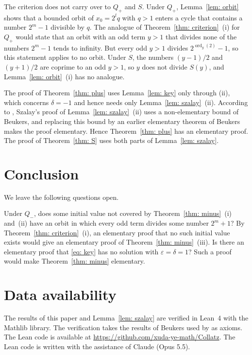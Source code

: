\documentclass{article}
\newcommand{\ord}{\operatorname{ord}}
\begin{document}
The criterion does not carry over to $Q_+$ and $S$. Under $Q_+$, Lemma~\ref{lem: orbit} shows that a bounded orbit of $x_0 = 2^l q$ with $q > 1$ enters a cycle that contains a number $2^m - 1$ divisible by $q$. The analogue of Theorem~\ref{thm: criterion}~(i) for $Q_+$ would state that an orbit with an odd term $y > 1$ that divides none of the numbers $2^m - 1$ tends to infinity. But every odd $y > 1$ divides $2^{\ord_y(2)} - 1$, so this statement applies to no orbit. Under $S$, the numbers $(y-1)/2$ and $(y+1)/2$ are coprime to an odd $y > 1$, so $y$ does not divide $S(y)$, and Lemma~\ref{lem: orbit}~(i) has no analogue.

The proof of Theorem~\ref{thm: plus} uses Lemma~\ref{lem: key} only through (ii), which concerns $\delta = -1$ and hence needs only Lemma~\ref{lem: szalay}~(ii). According to \citet[Section~1]{scott2006elementary}, Szalay's proof of Lemma~\ref{lem: szalay}~(ii) uses a non-elementary bound of Beukers, and replacing this bound by an earlier elementary theorem of Beukers makes the proof elementary. Hence Theorem~\ref{thm: plus} has an elementary proof. The proof of Theorem~\ref{thm: S} uses both parts of Lemma~\ref{lem: szalay}.

\section{Conclusion}
\label{sec: conclusion}

We leave the following questions open.

Under $Q_-$, does some initial value not covered by Theorem~\ref{thm: minus}~(i) and~(ii) have an orbit in which every odd term divides some number $2^m + 1$? By Theorem~\ref{thm: criterion}~(i), an elementary proof that no such initial value exists would give an elementary proof of Theorem~\ref{thm: minus}~(iii). Is there an elementary proof that \eqref{eq: key} has no solution with $\varepsilon = \delta = 1$? Such a proof would make Theorem~\ref{thm: minus} elementary.

\section*{Data availability}

The results of this paper and Lemma~\ref{lem: szalay} are verified in Lean~4 with the Mathlib library. The verification takes the results of Beukers used by \citet{szalay2002equations} as axioms. The Lean code is available at \url{https://github.com/xuda-ye-math/Collatz}. The Lean code is written with the assistance of Claude (Opus 5.5).



\end{document}
